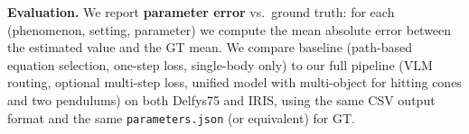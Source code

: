 \textbf{Evaluation.} We report \textbf{parameter error} vs.\ ground truth: for each (phenomenon, setting, parameter) we compute the mean absolute error between the estimated value and the GT mean. We compare baseline (path-based equation selection, one-step loss, single-body only) to our full pipeline (VLM routing, optional multi-step loss, unified model with multi-object for hitting cones and two pendulums) on both Delfys75 and IRIS, using the same CSV output format and the same \texttt{parameters.json} (or equivalent) for GT.
